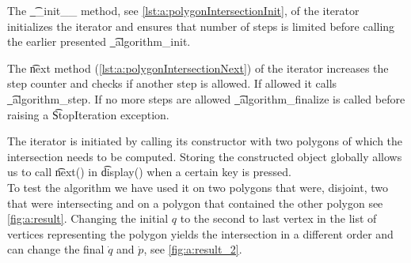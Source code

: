 	The \t{__init__} method, see \autoref{lst:a:polygonIntersectionInit}, of the iterator initializes the iterator and ensures that number of steps is limited before calling the earlier presented \t{_algorithm_init}. 

	The \t{next} method (\autoref{lst:a:polygonIntersectionNext}) of the iterator increases the step counter and checks if another step is allowed. If allowed it calls \t{_algorithm_step}. If no more steps are allowed \t{_algorithm_finalize} is called before raising a \t{StopIteration} exception. 

	

	

	The iterator is initiated by calling its constructor with two polygons of which the intersection needs to be computed. Storing the constructed object globally allows us to call \t{next()} in \t{display()} when a certain key is pressed.\\

	To test the algorithm we have used it on two polygons that were, disjoint, two that were intersecting and on a polygon that contained the other polygon see \autoref{fig:a:result}. Changing the initial $q$ to the second to last vertex in the list of vertices representing the polygon yields the intersection in a different order and can change the final $\dot{q}$ and $\dot{p}$, see \autoref{fig:a:result_2}.

